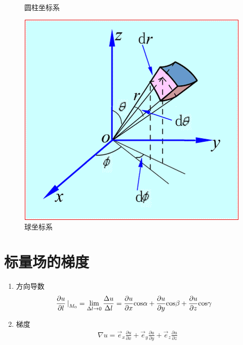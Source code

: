 \begin{enumerate}
\begin{figure}
			\caption{圆柱坐标系}
			\label{fig:yuanzhu}
		\end{figure}
		\begin{figure}
			\centering
			\includegraphics[keepaspectratio]{pics/球坐标系}
			\caption{球坐标系}
			\label{fig:qiu}
		\end{figure}
\end{enumerate}

\section{标量场的梯度}
\begin{enumerate}
	\item 方向导数
		\begin{eqnarray}
		&\frac{{\partial u}}{{\partial l}}\mathop |\nolimits_{{M_0}}  = \mathop {{\rm{lim}}}\limits_{\Delta l \to 0} \frac{{\Delta u}}{{\Delta l}} = \frac{{\partial u}}{{\partial x}}{\rm{cos}}\alpha  + \frac{{\partial u}}{{\partial y}}{\rm{cos}}\beta  + \frac{{\partial u}}{{\partial z}}{\rm{cos}}\gamma&
		\end{eqnarray}
	\item 梯度
		\begin{eqnarray}
		&\nabla u = {\vec e_x}\frac{{\partial u}}{{\partial x}} + {\vec e_y}\frac{{\partial u}}{{\partial y}} + {\vec e_z}\frac{{\partial u}}{{\partial z}}&
		\end{eqnarray}
\end{enumerate}

